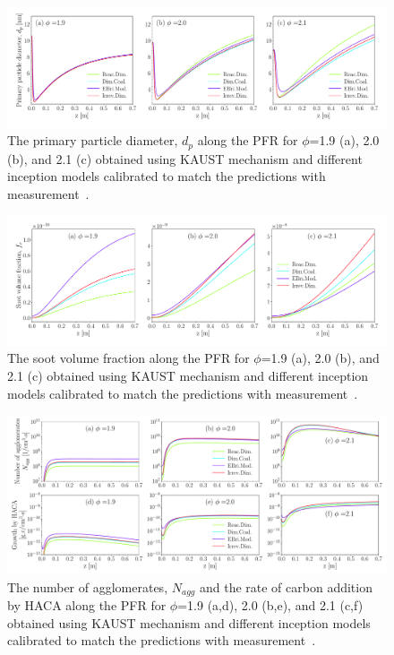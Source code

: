\begin{figure}[H]
	\centering
	\includegraphics[width=1\textwidth]{Figures/Results/PSR/d_p_eq_ratio_all_single_mech.pdf}
	\caption{The primary particle diameter, $d_p$ along the PFR for $\phi$=1.9 (a), 2.0 (b), and 2.1 (c) obtained using KAUST mechanism and different inception models calibrated to match the predictions with measurement~\citep{manzello2007soot}.}
	\label{fig:psrpfr_dp} 
\end{figure}

\begin{figure}[H]
	\centering
	\includegraphics[width=1\textwidth]{Figures/Results/PSR/f_v_eq_ratio_all_single_mech.pdf}
	\caption{The soot volume fraction along the PFR for $\phi$=1.9 (a), 2.0 (b), and 2.1 (c) obtained using KAUST mechanism and different inception models calibrated to match the predictions with measurement~\citep{manzello2007soot}.}
	\label{fig:psrpfr_fv} 
\end{figure}


\begin{figure}[H]
	\centering
	\includegraphics[width=1\textwidth]{Figures/Results/PSR/N_agg_HACA_eq_ratio_all_single_mech.pdf}
	\caption{The number of agglomerates, $N_{agg}$ and the rate of carbon addition by HACA  along the PFR for $\phi$=1.9 (a,d), 2.0 (b,e), and 2.1 (c,f) obtained using KAUST mechanism and different inception models calibrated to match the predictions with measurement~\citep{manzello2007soot}.}
	\label{fig:psrpfr_Nagg_HACA} 
\end{figure}


